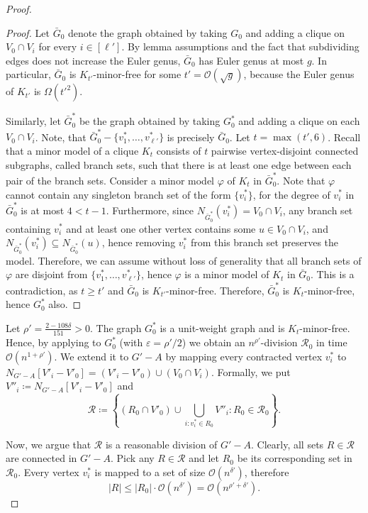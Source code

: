 \documentclass[11pt,a4paper]{article}
\newcommand{\Oh}{\mathcal{O}}
\renewcommand{\leq}{\leqslant}
\renewcommand{\geq}{\geqslant}
\begin{document}
\begin{proof}
\begin{proof}
Let $\bar{G}_0$ denote the graph obtained by taking $G_0$ and adding a clique on $V_0 \cap V_i$ for every $i \in [\ell']$.
By lemma assumptions and the fact that subdividing edges does not increase the Euler genus, $\bar{G}_0$ has Euler genus at most $g$. In particular, $\bar{G}_0$ is $K_{t'}$-minor-free for some $t' = \Oh(\sqrt{g})$, because the Euler genus of $K_{t'}$ is $\Omega({t'}^2)$.

Similarly, let $\bar{G}_0^*$ be the graph obtained by taking $G_0^*$ and adding a clique on each $V_0 \cap V_i$.
Note, that $\bar{G}_0^* - \{v_1^*, \dots, v_{\ell'}^*\}$ is precisely $\bar{G}_0$. Let $t = \max(t', 6)$.
Recall that a minor model of a clique $K_t$ consists of $t$ pairwise vertex-disjoint connected subgraphs, called
branch sets, such that there is at least one edge between each pair of the branch sets.
Consider a minor model $\varphi$ of $K_{t}$ in $\bar{G}^*_0$.
Note that $\varphi$ cannot contain any singleton branch set of the form $\{v^*_i\}$, for the degree of $v^*_i$ in $\bar{G}^*_0$ is at most $4 < t - 1$. Furthermore, since $N_{\bar{G}^*_0}(v^*_i) = V_0 \cap V_i$, any branch set containing $v^*_i$ and at least one other vertex contains some $u \in V_0 \cap V_i$, and $N_{\bar{G}^*_0}(v^*_i)\subseteq N_{\bar{G}^*_0}(u)$, hence removing $v^*_i$ from this branch set preserves the model. Therefore, we can assume without loss of generality that all branch sets of $\varphi$ are disjoint from $\{v^*_1, \dots, v^*_{\ell'}\}$, hence $\varphi$ is a minor model of $K_{t}$ in $\bar{G}_0$. This is a contradiction, as $t \geq t'$ and $\bar{G}_0$ is $K_{t'}$-minor-free. Therefore, $\bar{G}_0^*$ is $K_t$-minor-free, hence $G_0^*$ also.
\end{proof}

Let $\rho' = \frac{2 - 108 \delta}{151} > 0$. The graph $G^*_0$ is a unit-weight graph and is $K_{t}$-minor-free.
Hence, by applying  to $G^*_0$ (with $\varepsilon = \rho'/2$)
we obtain an $n^{\rho'}$-division $\mathcal{R}_0$ in time $\Oh(n^{1 + \rho'})$.
We extend it to $G' - A$ by mapping every contracted vertex $v^*_i$ to $N_{G' - A}[V'_i - V'_0] = (V'_i - V'_0) \cup (V_0 \cap V_i)$. Formally, we put $V''_i \coloneqq N_{G' - A}[V'_i - V'_0]$ and 
$$
\mathcal{R} \coloneqq \left\{ (R_0 \cap V'_0) \cup \bigcup_{i \colon v^*_i \in R_0} V''_i \colon R_0 \in \mathcal{R}_0 \right\}.
$$

Now, we argue that $\mathcal{R}$ is a reasonable division of $G' - A$. Clearly, all sets $R \in \mathcal{R}$ are connected in $G' - A$. Pick any $R \in \mathcal{R}$ and let $R_0$ be its corresponding set in $\mathcal{R}_0$.
Every vertex $v^*_i$ is mapped to a set of size $\Oh(n^{\delta'})$, therefore
$$|R| \leq |R_0| \cdot \Oh(n^{\delta'}) = \Oh(n^{\rho' + \delta'}).$$


\end{proof}
\end{document}
